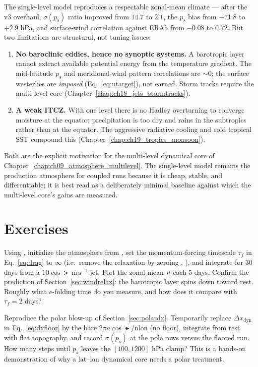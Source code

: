 The single-level model reproduces a respectable zonal-mean climate --- after the v3
overhaul, $\sigma(p_s)$ ratio improved from $14.7$ to $2.1$, the $p_s$ bias from
$-71.8$ to $+2.9$ hPa, and surface-wind correlation against ERA5 from $-0.08$ to
$0.72$. But two limitations are structural, not tuning issues:
\begin{enumerate}[leftmargin=2em]
  \item \textbf{No baroclinic eddies, hence no synoptic systems.} A barotropic
    layer cannot extract available potential energy from the temperature gradient.
    The mid-latitude $p_s$ and meridional-wind pattern correlations are
    $\sim 0$; the surface westerlies are \emph{imposed}
    (Eq.~\eqref{eq:utarget}), not earned. Storm tracks require the multi-level core
    (Chapter~\ref{chap:ch18_jets_stormtracks}).
  \item \textbf{A weak ITCZ.} With one level there is no Hadley overturning to
    converge moisture at the equator; precipitation is too dry and rains in the
    subtropics rather than at the equator. The aggressive radiative cooling and
    cold tropical SST compound this (Chapter~\ref{chap:ch19_tropics_monsoon}).
\end{enumerate}
Both are the explicit motivation for the multi-level dynamical core of
Chapter~\ref{chap:ch09_atmosphere_multilevel}. The single-level model remains the
production atmosphere for coupled runs because it is cheap, stable, and
differentiable; it is best read as a deliberately minimal baseline against which the
multi-level core's gains are measured.

\section*{Exercises}

\begin{exercise}
Using , initialize the atmosphere from ,
set the momentum-forcing timescale $\tau_f$ in Eq.~\eqref{eq:drag} to
$\infty$ (i.e.\ remove the relaxation by zeroing , ),
and integrate for 30 days from a $10\cos\lat\ \mathrm{m\,s^{-1}}$ jet. Plot the
zonal-mean $u$ each 5 days. Confirm the prediction of Section~\ref{sec:windrelax}:
the barotropic layer spins down toward rest. Roughly what $e$-folding time do you
measure, and how does it compare with $\tau_f=2$ days?
\end{exercise}

\begin{exercise}
Reproduce the polar blow-up of Section~\ref{sec:polardx}. Temporarily replace
$\Delta x_{\mathrm{dyn}}$ in Eq.~\eqref{eq:dxfloor} by the bare
$2\pi a\cos\lat/\mathrm{nlon}$ (no floor), integrate from rest with flat
topography, and record $\sigma(p_s)$ at the pole rows versus the floored run. How
many steps until $p_s$ leaves the $[100,1200]$ hPa clamp? This is a hands-on
demonstration of why a lat--lon dynamical core needs a polar treatment.
\end{exercise}

